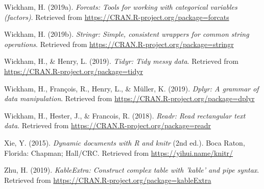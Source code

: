 \documentclass[man, fleqn, noextraspace,floatsintext]{apa6}
\begin{document}
\hypertarget{ref-R-forcats}{}
Wickham, H. (2019a). \emph{Forcats: Tools for working with categorical
variables (factors)}. Retrieved from
\url{https://CRAN.R-project.org/package=forcats}

\hypertarget{ref-R-stringr}{}
Wickham, H. (2019b). \emph{Stringr: Simple, consistent wrappers for
common string operations}. Retrieved from
\url{https://CRAN.R-project.org/package=stringr}

\hypertarget{ref-R-tidyr}{}
Wickham, H., \& Henry, L. (2019). \emph{Tidyr: Tidy messy data}.
Retrieved from \url{https://CRAN.R-project.org/package=tidyr}

\hypertarget{ref-R-dplyr}{}
Wickham, H., François, R., Henry, L., \& Müller, K. (2019). \emph{Dplyr:
A grammar of data manipulation}. Retrieved from
\url{https://CRAN.R-project.org/package=dplyr}

\hypertarget{ref-R-readr}{}
Wickham, H., Hester, J., \& Francois, R. (2018). \emph{Readr: Read
rectangular text data}. Retrieved from
\url{https://CRAN.R-project.org/package=readr}

\hypertarget{ref-R-knitr}{}
Xie, Y. (2015). \emph{Dynamic documents with R and knitr} (2nd ed.).
Boca Raton, Florida: Chapman; Hall/CRC. Retrieved from
\url{https://yihui.name/knitr/}

\hypertarget{ref-R-kableExtra}{}
Zhu, H. (2019). \emph{KableExtra: Construct complex table with 'kable'
and pipe syntax}. Retrieved from
\url{https://CRAN.R-project.org/package=kableExtra}

\endgroup
\end{document}
